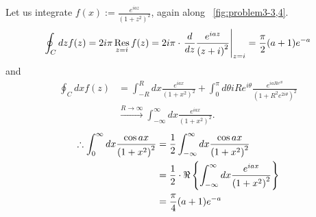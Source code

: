 \item

Let us integrate $f(x) := \frac{e^{iaz}}{{\left( 1 + z^2 \right)}^2}$, again along ~\ref{fig:problem3-3,4}.
\begin{align*}
	\oint_C dz f(z)
	= 2i\pi \mathop{\mathrm{Res}}_{z = i} f(z)
	= 2i\pi \cdot {\left. \frac{d}{dz} \frac{e^{iaz}}{{\left( z + i \right)}^2} \right|}_{z = i}
	= \frac{\pi}{2} (a + 1) e^{-a}
\end{align*}
and
\begin{align*}
	\oint_C dx f(z)
	 & = \int_{-R}^{R} dx \frac{e^{iax}}{{\left( 1 + x^2 \right)}^2}
	+\int_0^{\pi} d\theta iRe^{i\theta} \frac{e^{iaRe^{i\theta}}}{{\left( 1 + R^2 e^{2i\theta} \right)}^2}       \\
	 & \xrightarrow{R \rightarrow \infty} \int_{-\infty}^{\infty} dx \frac{e^{iax}}{{\left( 1 + x^2 \right)}^2}.
\end{align*}
\begin{align*}
	\therefore \int_{0}^{\infty} dx \frac{\cos ax}{{\left( 1 + x^2 \right)}^2}
	 & = \frac{1}{2} \int_{-\infty}^{\infty} dx \frac{\cos ax}{{\left( 1 + x^2 \right)}^2}                            \\
	 & = \frac{1}{2} \cdot \Re \left\{ \int_{-\infty}^{\infty} dx \frac{e^{iax}}{{\left( 1 + x^2 \right)}^2} \right\} \\
	 & = \frac{\pi}{4} (a + 1) e^{-a}
\end{align*}